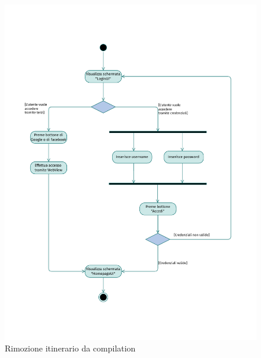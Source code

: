 \documentclass{natourDoc}
\begin{document}
\newpage
\begin{figure}[!htbp]
	\centering
	\includegraphics[width=\textwidth, page=9]{./diagrams/activity.pdf}
	\caption{Rimozione itinerario da compilation}
\end{figure}
\FloatBarrier

\newpage
\end{document}
